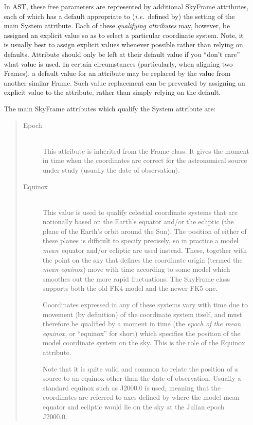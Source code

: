 \documentclass[twoside,11pt]{article}
\begin{document}
In AST, these free parameters are represented by additional SkyFrame
attributes, each of which has a default appropriate to
({\em{i.e.}}\ defined by) the setting of the main System
attribute. Each of these {\em{qualifying attributes}} may, however, be
assigned an explicit value so as to select a particular coordinate
system. Note, it is usually best to assign explicit
values whenever possible rather than relying on defaults. Attribute
should only be left at their default value if you ``don't care'' what
value is used. In certain circumstances (particularly, when aligning two
Frames), a default value for an attribute may be replaced by the value
from another similar Frame. Such value replacement can be prevented by
assigning an explicit value to the attribute, rather than simply relying on
the default.


The main SkyFrame attributes which qualify the System attribute are:

\begin{quote}
\begin{description}

\item[\label{ss:epochitem}Epoch]\mbox{}\\
This attribute is inherited from the Frame class. It gives the moment in
time when the coordinates are correct for the astronomical source
under study (usually the date of observation).

\item[\label{ss:equinoxitem}Equinox]\mbox{}\\
This value is used to qualify celestial coordinate systems that are
notionally based on the Earth's equator and/or the ecliptic (the plane
of the Earth's orbit around the Sun). The position of either of these
planes is difficult to specify precisely, so in practice a model
{\em{mean}}\ equator and/or ecliptic are used instead. These, together
with the point on the sky that defines the coordinate origin (termed
the {\em{mean equinox}}) move with time according to some model which
smoothes out the more rapid fluctuations. The SkyFrame class supports
both the old FK4 model and the newer FK5 one.

Coordinates expressed in any of these systems vary with time due to
movement (by definition) of the coordinate system itself, and must
therefore be qualified by a moment in time (the {\em{epoch of the mean
equinox,}} or ``equinox'' for short) which specifies the position of
the model coordinate system on the sky. This is the role of the
Equinox attribute.

Note that it is quite valid and common to relate the position of a
source to an equinox other than the date of observation. Usually a
standard equinox such as J2000.0 is used, meaning that the coordinates
are referred to axes defined by where the model mean equator and
ecliptic would lie on the sky at the Julian epoch J2000.0.
\end{description}
\end{quote}
\end{document}
